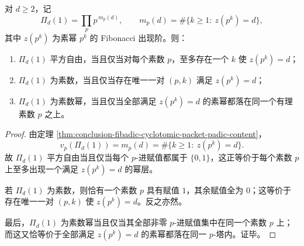 \begin{proposition}\label{prop:conclusion-fibadic-depth-content-prime-power-detection}
对 \(d\ge 2\)，记
\[
\Pi_d(1)=\prod_p p^{\,m_p(d)},
\qquad
m_p(d)=\#\{k\ge 1:\ z(p^k)=d\},
\]
其中 \(z(p^k)\) 为素幂 \(p^k\) 的 Fibonacci 出现阶。则：
\begin{enumerate}
  \item \(\Pi_d(1)\) 平方自由，当且仅当对每个素数 \(p\)，至多存在一个 \(k\) 使 \(z(p^k)=d\)；
  \item \(\Pi_d(1)\) 为素数，当且仅当存在唯一一对 \((p,k)\) 满足 \(z(p^k)=d\)；
  \item \(\Pi_d(1)\) 为素数幂，当且仅当全部满足 \(z(p^k)=d\) 的素幂都落在同一个有理素数 \(p\) 之上。
\end{enumerate}
\end{proposition}
\begin{proof}
由定理 \ref{thm:conclusion-fibadic-cyclotomic-packet-padic-content}，
\[
v_p(\Pi_d(1))=m_p(d)=\#\{k\ge 1:\ z(p^k)=d\}.
\]
故 \(\Pi_d(1)\) 平方自由当且仅当每个 \(p\)-进赋值都属于 \(\{0,1\}\)，这正等价于每个素数 \(p\) 上至多出现一个满足 \(z(p^k)=d\) 的幂层。

若 \(\Pi_d(1)\) 为素数，则恰有一个素数 \(p\) 具有赋值 \(1\)，其余赋值全为 \(0\)；这等价于存在唯一一对 \((p,k)\) 使 \(z(p^k)=d\)。反之亦然。

最后，\(\Pi_d(1)\) 为素数幂当且仅当其全部非零 \(p\)-进赋值集中在同一个素数 \(p\) 上；而这又恰等价于全部满足 \(z(p^k)=d\) 的素幂都落在同一 \(p\)-塔内。证毕。
\end{proof}

